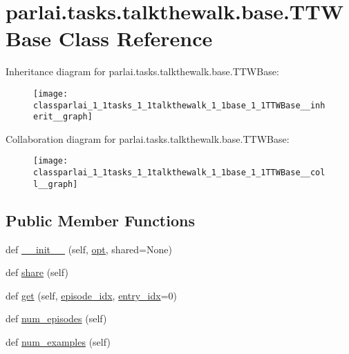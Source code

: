 \hypertarget{classparlai_1_1tasks_1_1talkthewalk_1_1base_1_1TTWBase}{}\section{parlai.\+tasks.\+talkthewalk.\+base.\+T\+T\+W\+Base Class Reference}
\label{classparlai_1_1tasks_1_1talkthewalk_1_1base_1_1TTWBase}


Inheritance diagram for parlai.\+tasks.\+talkthewalk.\+base.\+T\+T\+W\+Base\+:
\nopagebreak
\begin{figure}[H]
\begin{center}
\leavevmode
\texttt{[image: classparlai\_1\_1tasks\_1\_1talkthewalk\_1\_1base\_1\_1TTWBase\_\_inherit\_\_graph]}
\end{center}
\end{figure}


Collaboration diagram for parlai.\+tasks.\+talkthewalk.\+base.\+T\+T\+W\+Base\+:
\nopagebreak
\begin{figure}[H]
\begin{center}
\leavevmode
\texttt{[image: classparlai\_1\_1tasks\_1\_1talkthewalk\_1\_1base\_1\_1TTWBase\_\_coll\_\_graph]}
\end{center}
\end{figure}
\subsection*{Public Member Functions}
\begin{DoxyCompactItemize}
\item 
def \hyperlink{classparlai_1_1tasks_1_1talkthewalk_1_1base_1_1TTWBase_abde7fa2ca98467601795e5873285d8a0}{\+\_\+\+\_\+init\+\_\+\+\_\+} (self, \hyperlink{classparlai_1_1tasks_1_1talkthewalk_1_1base_1_1TTWBase_aa716b1fde5dd6d0409ff111df962067e}{opt}, shared=None)
\item 
def \hyperlink{classparlai_1_1tasks_1_1talkthewalk_1_1base_1_1TTWBase_ac8cfd853c90d3dbc0ee6ada6dbc23726}{share} (self)
\item 
def \hyperlink{classparlai_1_1tasks_1_1talkthewalk_1_1base_1_1TTWBase_adda57628371cdbb1afef6f297dab7c54}{get} (self, \hyperlink{classparlai_1_1core_1_1teachers_1_1FixedDialogTeacher_afd4ebab8063eb42d182d30a1a41f133e}{episode\+\_\+idx}, \hyperlink{classparlai_1_1core_1_1teachers_1_1FixedDialogTeacher_ae3201b15f3c3b46a2f3511bad9b43e7d}{entry\+\_\+idx}=0)
\item 
def \hyperlink{classparlai_1_1tasks_1_1talkthewalk_1_1base_1_1TTWBase_ab4890c4569ff31724718ed8c684e1a76}{num\+\_\+episodes} (self)
\item 
def \hyperlink{classparlai_1_1tasks_1_1talkthewalk_1_1base_1_1TTWBase_a691d7f4a22c6ea032489ea70fe5d6b35}{num\+\_\+examples} (self)
\end{DoxyCompactItemize}
